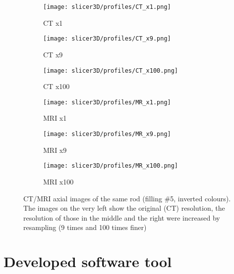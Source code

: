 \begin{figure}[!thb]
  \begin{subfigure}[b]{0.32\textwidth}
    \texttt{[image: slicer3D/profiles/CT\_x1.png]}
    \caption{CT x1}
    \label{fig:CT_x1}
  \end{subfigure}
  \hfill
  \begin{subfigure}[b]{0.32\textwidth}
    \texttt{[image: slicer3D/profiles/CT\_x9.png]}
    \caption{CT x9}
    \label{fig:CT_x9}
  \end{subfigure}
    \hfill
  \begin{subfigure}[b]{0.32\textwidth}
    \texttt{[image: slicer3D/profiles/CT\_x100.png]}
    \caption{CT x100}
    \label{fig:CT_x100}
  \end{subfigure}
  \begin{subfigure}[b]{0.32\textwidth}
    \texttt{[image: slicer3D/profiles/MR\_x1.png]}
    \caption{MRI x1}
    \label{fig:MRI_x1}
  \end{subfigure}
  \hfill
  \begin{subfigure}[b]{0.32\textwidth}
    \texttt{[image: slicer3D/profiles/MR\_x9.png]}
    \caption{MRI x9}
    \label{fig:MRI_x9}
  \end{subfigure}
    \hfill
  \begin{subfigure}[b]{0.32\textwidth}
    \texttt{[image: slicer3D/profiles/MR\_x100.png]}
    \caption{MRI x100}
    \label{fig:MRI_x100}
  \end{subfigure}
  \caption{CT/MRI axial images of the same rod (filling \#5, inverted colours). The images on the very left show the original (CT) resolution, the resolution of those in the middle and the right were increased by resampling (9 times and 100 times finer)}
  \label{fig:resample}
\end{figure}
\clearpage

\section{Developed software tool}

